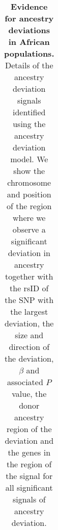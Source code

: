 \clearpage

\footnotesize

\begin{longtable}{|r|l|c|c|c|l|p{8cm}|l|}

\caption[Evidence for ancestry deviations in African populations.]{\textbf{Evidence for ancestry deviations in African populations.} Details of the ancestry deviation signals identified using the ancestry deviation model. We show the chromosome and position of the region where we observe a significant deviation in ancestry together with the rsID of the SNP with the largest deviation, the size and direction of the deviation, $\beta$ and associated $P$ value, the donor ancestry region of the deviation and the genes in the region of the signal for all significant signals of ancestry deviation.}
\label{tab:AllResults}\\


\end{longtable}
